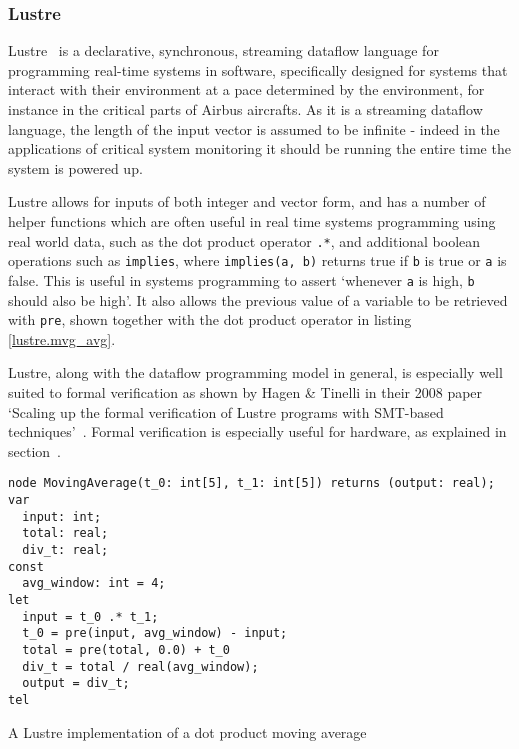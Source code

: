 \subsubsection{Lustre}
Lustre \cite{lustre} is a declarative, synchronous, streaming dataflow language for programming real-time systems in software, specifically designed for systems that interact with their environment at a pace determined by the environment, for instance in the critical parts of Airbus aircrafts. As it is a streaming dataflow language, the length of the input vector is assumed to be infinite \hyphen{} indeed in the applications of critical system monitoring it should be running the entire time the system is powered up.

Lustre allows for inputs of both integer and vector form, and has a number of helper functions which are often useful in real time systems programming using real world data, such as the dot product operator \lstinline|.*|, and additional boolean operations such as \lstinline|implies|, where \lstinline|implies(a, b)| returns true if \lstinline|b| is true or \lstinline|a| is false. This is useful in systems programming to assert `whenever \lstinline|a| is high, \lstinline|b| should also be high'. It also allows the previous value of a variable to be retrieved with \lstinline|pre|, shown together with the dot product operator in listing \ref{lustre.mvg_avg}.

Lustre, along with the dataflow programming model in general, is especially well suited to formal verification as shown by Hagen \& Tinelli in their 2008 paper `Scaling up the formal verification of Lustre programs with SMT-based techniques' \cite{lustreverification}. Formal verification is especially useful for hardware, as explained in section \cite{formal_verif}.

\renewcommand\theFancyVerbLine{\arabic{FancyVerbLine}}
\begin{listing}[H]
  \begin{verbatim}
node MovingAverage(t_0: int[5], t_1: int[5]) returns (output: real);
var
  input: int;
  total: real;
  div_t: real;
const
  avg_window: int = 4;
let
  input = t_0 .* t_1;
  t_0 = pre(input, avg_window) - input;
  total = pre(total, 0.0) + t_0
  div_t = total / real(avg_window);
  output = div_t;
tel
  \end{verbatim}
  \caption{A Lustre implementation of a dot product moving average}\label{lustre.mvg_avg}
\end{listing}

